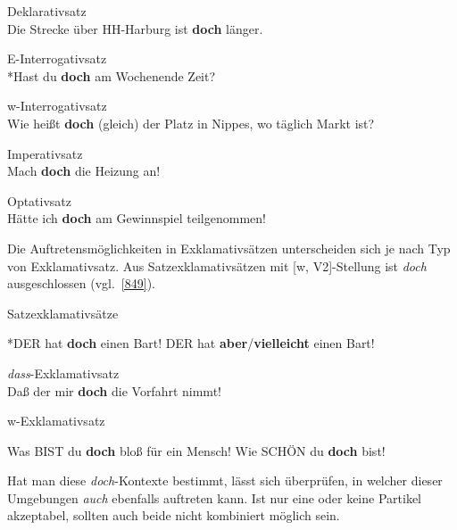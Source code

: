 {\begin{exe}
	\ex\label{844} Deklarativsatz\\
	Die Strecke über HH-Harburg ist \textbf{doch} länger.
\end{exe}

\begin{exe}
	\ex\label{845} E-Interrogativsatz\\
	*Hast du \textbf{doch} am Wochenende Zeit?
\end{exe}	
	
\begin{exe}
	\ex\label{846} w-Interrogativsatz\\
	Wie heißt \textbf{doch} (gleich) der Platz in Nippes, wo täglich Markt ist?
\end{exe}		
	
\begin{exe}
	\ex\label{847} Imperativsatz\\
	Mach \textbf{doch} die Heizung an!
\end{exe}	
		
\begin{exe}
	\ex\label{848} Optativsatz\\
	Hätte ich \textbf{doch} am Gewinnspiel teilgenommen!
\end{exe}		
Die Auftretensmöglichkeiten in Exklamativsätzen unterscheiden sich je nach Typ von Exklamativsatz. Aus Satzexklamativsätzen mit [\textminus w, V2]-Stellung ist \textit{doch} ausgeschlossen (vgl.\ \ref{849}).
	
\begin{exe}
	\ex\label{849}Satzexklamativsätze\\[-1.25em]
		\begin{xlist}	
			\ex\label{849a} *DER hat \textbf{doch} einen Bart!
			\ex\label{849b} DER hat \textbf{aber}/\textbf{vielleicht} einen Bart!	
			\hfill\hbox{\citet[218]{Rinas2006}}
		\end{xlist}
\end{exe}	
	
\begin{exe}
	\ex\label{850}\textit{dass}-Exklamativsatz\\
	Daß der mir \textbf{doch} die Vorfahrt nimmt!
	\newline
	\hbox{}\hfill\hbox{\citet[152]{Zaefferer1988}}
\end{exe}
	
\begin{exe}
	\ex\label{851}w-Exklamativsatz\\[-1.25em] 
		\begin{xlist}	
			\ex\label{851a} Was BIST du \textbf{doch} bloß für ein Mensch!
			\ex\label{851b} Wie SCHÖN du \textbf{doch} bist!	
			\hfill\hbox{\citet[218--219]{Rinas2006}}
		\end{xlist}
\end{exe}		
Hat man diese \textit{doch}-Kontexte bestimmt, lässt sich überprüfen, in welcher dieser Umgebungen \textit{auch} ebenfalls auftreten kann. Ist nur eine oder keine Partikel akzeptabel, sollten auch beide nicht kombiniert möglich sein.

}
